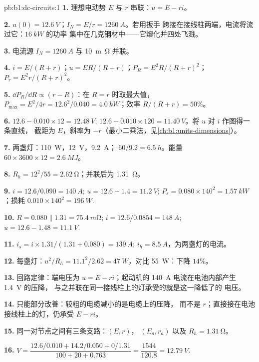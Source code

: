 \begin{solution}{pb:b1:dc-circuits:1}
\textbf{1.} 理想电动势 $E$ 与 $r$ 串联：$u = E - ri$。

\textbf{2.} $u(0) = \qty{12.6}{V}$；$I_N = E/r = \qty{1260}{A}$。若用扳手
跨接在接线柱两端，电流将流过它：$\qty{16}{kW}$ 的功率
集中在几克钢材中——它熔化并四处飞溅。

\textbf{3.} 电流源 $I_N = \qty{1260}{A}$ 与
\qty{10}{m\ohm} 并联。

\textbf{4.} $i = E/(R + r)$；$u = ER/(R + r)$；$P_R = E^2R/(R + r)^2$；
$P_r = E^2r/(R + r)^2$。

\textbf{5.} $\dd P_R/\dd R \propto (r - R)$：在 $R = r$ 时取最大值，
$P_{\max} = E^2/4r = 12.6^2/0.040 = \qty{4.0}{kW}$；效率
$R/(R + r) = 50\%$。

\textbf{6.} $12.6 - 0.010 \times 12 = \qty{12.48}{V}$; $12.6 - 0.010 \times
120 = \qty{11.40}{V}$。将 $u$ 对 $i$ 作图得一条直线，
截距为 $E$，斜率为 $-r$（最小二乘法，见\cref{ch:b1:units-dimensions}）。

\textbf{7.} 两盏灯：\qty{110}{W}，\qty{12}{V}，\qty{9.2}{A}；
$60/9.2 = \qty{6.5}{h}$。能量 $60 \times 3600 \times 12 = \qty{2.6}{MJ}$。

\textbf{8.} $R_h = 12^2/55 = \qty{2.62}{\ohm}$；并联后为 \qty{1.31}{\ohm}。

\textbf{9.} $i = 12.6/0.090 = \qty{140}{A}$; $u = 12.6 - 1.4 = \qty{11.2}{V}$;
$P_s = 0.080 \times 140^2 = \qty{1.57}{kW}$；损耗 $0.010 \times 140^2 =
\qty{196}{W}$.

\textbf{10.} $R = 0.080 \parallel 1.31 = \qty{75.4}{m\ohm}$; $i = 12.6/0.0854
= \qty{148}{A}$; $u = 12.6 - 1.48 = \qty{11.1}{V}$.

\textbf{11.} $i_s = i \times 1.31/(1.31 + 0.080) = \qty{139}{A}$; $i_h =
\qty{8.5}{A}$，为两盏灯的电流。

\textbf{12.} 每盏灯：$u^2/R_h = 11.1^2/2.62 = \qty{47}{W}$，对比
\qty{55}{W}：下降 $14\%$。

\textbf{13.} 回路定律：端电压为 $u = E - ri$；起动机的
\qty{140}{A} 电流在电池内部产生 \qty{1.4}{V} 的压降，
与之并联在同一接线柱上的灯承受的就是这一降低了的
电压。

\textbf{14.} 只能部分改善：较粗的电缆减小的是电缆上的压降，
而不是 $r$；直接接在电池接线柱上的灯，仍承受 $E - ri$。

\textbf{15.} 同一对节点之间有三条支路：$(E, r)$，
$(E_a, r_a)$ 以及 $R_h = \qty{1.31}{\ohm}$。

\textbf{16.} $V = \dfrac{12.6/0.010 + 14.2/0.050 + 0/1.31}{100 + 20 + 0.763}
= \dfrac{1544}{120.8} = \qty{12.79}{V}$.


\end{solution}
